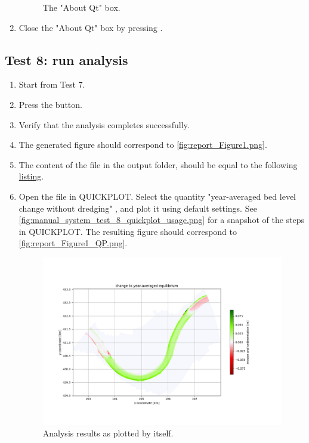 \begin{enumerate}
\begin{figure}[H]
	\caption{The "About Qt" box.}
	\label{fig:manual_system_test_7_about_qt.png}
\end{figure}
\item Close the "About Qt" box by pressing .
\end{enumerate}

\subsection{Test 8: run \dflowfm analysis}
\begin{enumerate}
\item Start from Test 7.
\item Press the  button.
\item Verify that the analysis completes successfully.
\item The generated figure should correspond to \autoref{fig:report_Figure1.png}.
\item The content of the  file in the output folder, should be equal to the following \hyperlink{code-report}{listing}.
\item Open the  file in QUICKPLOT.
Select the quantity "year-averaged bed level change without dredging" , and plot it using default settings.
See \autoref{fig:manual_system_test_8_quickplot_usage.png} for a snapshot of the steps in QUICKPLOT.
The resulting figure should correspond to \autoref{fig:report_Figure1_QP.png}.
\begin{figure}[H]
\center
\includegraphics[width=12cm]{figures/report_Figure1.png}
\caption{Analysis results as plotted by \dfmi itself.}
\label{fig:report_Figure1.png}
\end{figure}
\end{enumerate}

